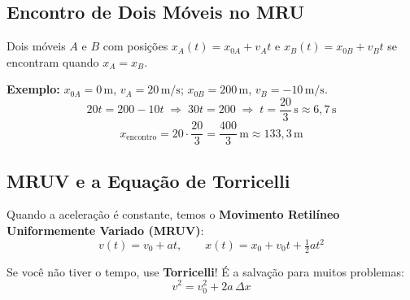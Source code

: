 \documentclass[10.5pt, a4paper]{extarticle}
\begin{document}
\begin{center}
\hspace{1cm}
\end{center}

\subsection{Encontro de Dois Móveis no MRU}

Dois móveis $A$ e $B$ com posições $x_A(t) = x_{0A} + v_A t$ e $x_B(t) = x_{0B} + v_B t$ se encontram quando $x_A = x_B$.

\begin{bulbabox}
\textbf{Exemplo:} $x_{0A}=0\,\text{m}$, $v_A=20\,\text{m/s}$; $x_{0B}=200\,\text{m}$, $v_B=-10\,\text{m/s}$.
\[
  20t = 200 - 10t \;\Rightarrow\; 30t = 200 \;\Rightarrow\; t = \frac{20}{3}\,\text{s} \approx 6{,}7\,\text{s}
\]
\[
  x_{\text{encontro}} = 20 \cdot \frac{20}{3} = \frac{400}{3}\,\text{m} \approx 133{,}3\,\text{m}
\]
\end{bulbabox}

\subsection{MRUV e a Equação de Torricelli}

Quando a aceleração é constante, temos o \textbf{Movimento Retilíneo Uniformemente Variado (MRUV)}:
\[
  v(t) = v_0 + at, \qquad x(t) = x_0 + v_0 t + \tfrac{1}{2}at^2
\]

\begin{pikabox}
Se você não tiver o tempo, use \textbf{Torricelli}! É a salvação para muitos problemas:
\[
  v^2 = v_0^2 + 2a\,\Delta x
\]
\end{pikabox}
\end{document}
